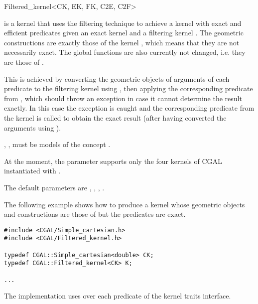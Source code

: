 \begin{ccRefClass}{Filtered_kernel<CK, EK, FK, C2E, C2F>}

\KernelRefLayout\gdef\ccTagOperatorLayout{\ccFalse}

\ccDefinition

\ccClassTemplateName is a kernel that uses the filtering technique
\cite{bbp-iayed-01} to achieve a kernel with exact and efficient
predicates given an exact kernel  and a filtering kernel
.  The geometric constructions are exactly those
of the kernel , which means that they are not necessarily exact.
The global functions are also currently not changed, i.e. they are those
of .

This is achieved by converting the geometric objects of  arguments of
each predicate to the filtering kernel  using , then applying
the corresponding predicate from , which should throw an exception in
case it cannot determine the result exactly.  In this case the exception is
caught and the corresponding predicate from the kernel  is called to
obtain the exact result (after having converted the arguments using
).

, ,  must be models of the concept .

At the moment, the parameter  supports only the four kernels of
CGAL instantiated with .

The default parameters are ,
  ,
  ,
  .



\ccExample

The following example shows how to produce a kernel whose geometric
objects and constructions are those of 
but the predicates are exact.

\begin{verbatim}
#include <CGAL/Simple_cartesian.h>
#include <CGAL/Filtered_kernel.h>

typedef CGAL::Simple_cartesian<double> CK;
typedef CGAL::Filtered_kernel<CK> K;

...
\end{verbatim}

\ccImplementation
The implementation uses  over
each predicate of the kernel traits interface.

\end{ccRefClass}

